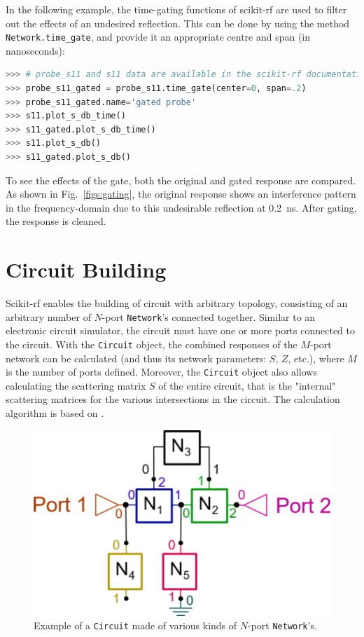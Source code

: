 \documentclass[journal, onecolumn]{IEEEtran}
\begin{document}
In the following example, the time-gating functions of scikit-rf are used to filter out the effects of an undesired reflection. This can be done by using the method \texttt{Network.time\_gate}, and provide it an appropriate centre and span (in nanoseconds):

\begin{lstlisting}[language=Python]
>>> # probe_s11 and s11 data are available in the scikit-rf documentation
>>> probe_s11_gated = probe_s11.time_gate(center=0, span=.2)
>>> probe_s11_gated.name='gated probe'
>>> s11.plot_s_db_time()
>>> s11_gated.plot_s_db_time()
>>> s11.plot_s_db()
>>> s11_gated.plot_s_db()
\end{lstlisting}

To see the effects of the gate, both the original and gated response are compared. As shown in Fig.~\ref{figs:gating}, the original response shows an interference pattern in the frequency-domain due to this undesirable reflection at \SI{0.2}{\nano\second}. After gating, the response is cleaned.


\section{Circuit Building}
Scikit-rf enables the building of circuit with arbitrary topology, consisting of an arbitrary number of $N$-port \texttt{Network}'s connected together. Similar to an electronic circuit simulator, the circuit must have one or more ports connected to the circuit. With the \texttt{Circuit} object, the combined responses of the $M$-port network can be calculated (and thus its network parameters: $S$, $Z$, etc.), where $M$ is the number of ports defined. Moreover, the \texttt{Circuit} object also allows calculating the scattering matrix $S$ of the entire circuit, that is the "internal" scattering matrices for the various intersections in the circuit. The calculation algorithm is based on \cite{hallbjorner2003}.

\begin{figure}
	\centering
	\includegraphics[width=0.95\linewidth]{figures/circuit}
	\caption{ Example of a \texttt{Circuit} made of various kinds of $N$-port \texttt{Network}'s.}
	\label{fig:circuit}
\end{figure}
\end{document}
